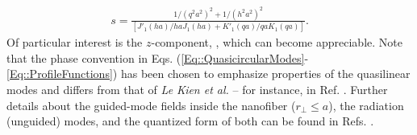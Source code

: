 \documentclass[preprint,aps,pra,onecolumn]{revtex4-1} %
\begin{document}
\begin{appendix}
	\begin{align}
		s = \frac{1/(q^2 a^2)^{2} + 1/(h^2 a^2)^{2}}{[J'_1(ha)/haJ_1(ha) + K'_1(qa)/qaK_1(qa)]}.
	\end{align}  
Of particular interest is the $z$-component, , which can become appreciable.  Note that the phase convention in Eqs. (\ref{Eq::QuasicircularModes}-\ref{Eq::ProfileFunctions}) has been chosen to emphasize properties of the quasilinear modes and differs from that of \emph{Le Kien et al.} -- for instance, in Ref. \cite{le_kien_propagation_2014}.  Further details about the guided-mode fields inside the nanofiber ($r_\perp\leq a$), the radiation (unguided) modes, and the quantized form of both can be found in Refs. \cite{sondergaard_general_2001, tong_single-mode_2004, kien_field_2004, le_kien_spontaneous_2005, Vetsch thesis}.



\end{appendix}
\end{document}
